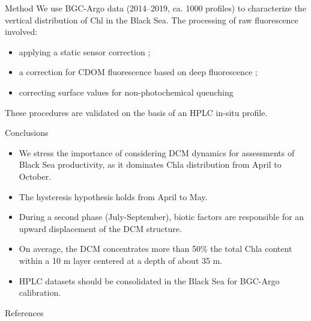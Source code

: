 \documentclass[final]{beamer}
\newcommand{\unit}[1]{$\mathrm{#1}$}
\begin{document}
\begin{frame}[fragile]
\begin{columns}[T]
\begin{column}{.33\textwidth}
\begin{block}{Method}
We use BGC-Argo data (2014–2019, ca. 1000 profiles) to characterize the vertical distribution of Chl in the Black Sea. The processing of raw fluorescence involved:
\begin{itemize}[wide, labelwidth=!,labelindent=0pt, label=$\diamond$]
    \item applying a static sensor correction \citep{Roesler2017};
    \item a correction for CDOM fluorescence based on deep fluorescence \citep{Xing2017};
    \item correcting surface values for non-photochemical quenching  \citep{Xing2012}
\end{itemize} 
These procedures are validated on the basis of an HPLC in-situ profile.
\end{block}

\begin{alertblock}{Conclusions}
\begin{itemize}[wide, labelwidth=!,labelindent=0pt, label=$\diamond$]
		    \item We stress the importance of considering DCM dynamics for assessments of Black Sea productivity, as it dominates Chla distribution from April to October.
	        \item  The hysteresis hypothesis \citep{Navarro2013} holds from April to May.
	        \item During a second phase (July-September), biotic factors are responsible for an upward displacement of the DCM structure.
	        \item On average, the DCM concentrates more than 50\% the total Chla content within a 10 \unit{m} layer centered at a depth of about 35 \unit{m}.  
	        \item HPLC datasets should be consolidated in the Black Sea for  BGC-Argo calibration.
	      \end{itemize}
	\end{alertblock}
	
	\begin{block}{References}
	\vskip -5mm
	  \footnotesize
    
	\end{block}
      \end{column}
      

\end{columns}
\end{frame}
\end{document}
